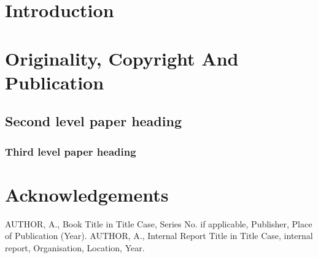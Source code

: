 \documentclass[10pt, a4paper, twoside]{article}
\begin{document}
\section{Introduction}
\lipsum[2-3]\cite{ref2}\cite{ref1}

\section{Originality, Copyright And Publication}
\lipsum[4-5]

\subsection{Second level paper heading}
\lipsum[6-7]

\subsubsection{Third level paper heading}
\lipsum[8-9]

\section*{Acknowledgements}
\lipsum[10]

\fontsize{9}{12}\selectfont
\setlength{\parskip}{0pt}
\begin{thebibliography}{9}
  AUTHOR, A., 
  Book Title in Title Case, 
  Series No. if applicable, 
  Publisher, 
  Place of Publication (Year).
  AUTHOR, A., 
  Internal Report Title in Title Case, 
  internal report, 
  Organisation,
  Location,
  Year.
\end{thebibliography}
\end{document}
